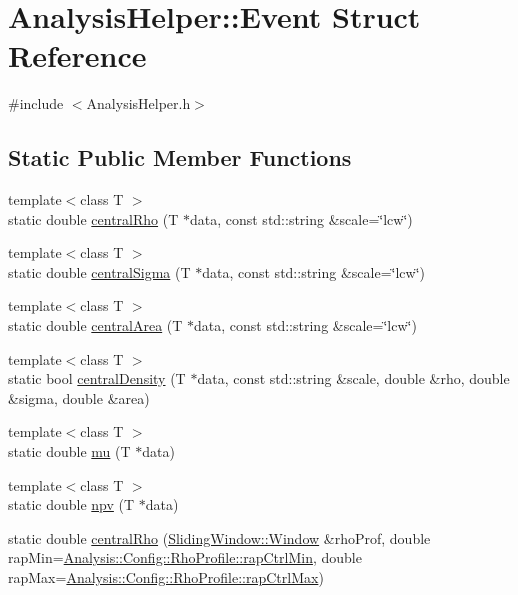 \hypertarget{structAnalysisHelper_1_1Event}{}\section{Analysis\+Helper\+:\+:Event Struct Reference}
\label{structAnalysisHelper_1_1Event}


{\ttfamily \#include $<$Analysis\+Helper.\+h$>$}

\subsection*{Static Public Member Functions}
\begin{DoxyCompactItemize}
\item 
{\footnotesize template$<$class T $>$ }\\static double \hyperlink{structAnalysisHelper_1_1Event_af3364ef6561569708980d6e0079909f4}{central\+Rho} (T $\ast$data, const std\+::string \&scale=\char`\"{}lcw\char`\"{})
\item 
{\footnotesize template$<$class T $>$ }\\static double \hyperlink{structAnalysisHelper_1_1Event_a13bc666c3375e53e185408073763f6e2}{central\+Sigma} (T $\ast$data, const std\+::string \&scale=\char`\"{}lcw\char`\"{})
\item 
{\footnotesize template$<$class T $>$ }\\static double \hyperlink{structAnalysisHelper_1_1Event_a5551c4c4ceca1feede52ebd4adede5b9}{central\+Area} (T $\ast$data, const std\+::string \&scale=\char`\"{}lcw\char`\"{})
\item 
{\footnotesize template$<$class T $>$ }\\static bool \hyperlink{structAnalysisHelper_1_1Event_a4c730fa25ae67fad7c57d676a3042812}{central\+Density} (T $\ast$data, const std\+::string \&scale, double \&rho, double \&sigma, double \&area)
\item 
{\footnotesize template$<$class T $>$ }\\static double \hyperlink{structAnalysisHelper_1_1Event_a056c3a5eabb31e1505af71d3a30225d6}{mu} (T $\ast$data)
\item 
{\footnotesize template$<$class T $>$ }\\static double \hyperlink{structAnalysisHelper_1_1Event_a63eb20f78715700503217a465cfc1644}{npv} (T $\ast$data)
\item 
static double \hyperlink{structAnalysisHelper_1_1Event_a1bf695030f403f0b69cbaab287bafb49}{central\+Rho} (\hyperlink{classSlidingWindow_1_1Window}{Sliding\+Window\+::\+Window} \&rho\+Prof, double rap\+Min=\hyperlink{namespaceAnalysis_1_1Config_1_1RhoProfile_a6a12ebe70b6648825eead16dff1159fd}{Analysis\+::\+Config\+::\+Rho\+Profile\+::rap\+Ctrl\+Min}, double rap\+Max=\hyperlink{namespaceAnalysis_1_1Config_1_1RhoProfile_ab78a2585916e0761da7090b86d5c762b}{Analysis\+::\+Config\+::\+Rho\+Profile\+::rap\+Ctrl\+Max})

\end{DoxyCompactItemize}
